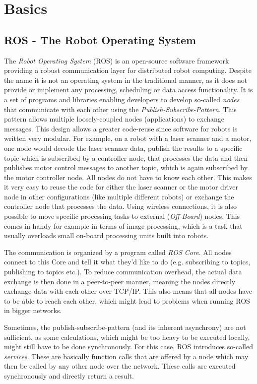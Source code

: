 \chapter{Basics}
\label{chap:basics}
\section{ROS - The Robot Operating System}

The \textit{Robot Operating System} (ROS) is an open-source software framework providing a robust communication layer for distributed robot computing\cite{ros:intro}. Despite the name it is not an operating system in the traditional manner, as it does not provide or implement any processing, scheduling or data access functionality. It is a set of programs and libraries enabling developers to develop so-called \textit{nodes} that communicate with each other using the \textit{Publish-Subscribe-Pattern}.
This pattern allows multiple loosely-coupled nodes (applications) to exchange messages. This design allows a greater code-reuse since software for robots is written very modular\cite{Eugster2003}. For example, on a robot with a laser scanner and a motor, one node would decode the laser scanner data, publish the results to a specific topic which is subscribed by a controller node, that processes the data and then publishes motor control messages to another topic, which is again subscribed by the motor controller node. All nodes do not have to know each other. This makes it very easy to reuse the code for either the laser scanner or the motor driver node in other configurations (like multiple different robots) or exchange the controller node that processes the data. Using wireless connections, it is also possible to move specific processing tasks to external (\textit{Off-Board}) nodes. This comes in handy for example in terms of image processing, which is a task that usually overloads small on-board processing units built into robots.

The communication is organized by a program called \textit{ROS Core}. All nodes connect to this Core and tell it what they'd like to do (e.g. subscribing to topics, publishing to topics etc.). To reduce communication overhead, the actual data exchange is then done in a peer-to-peer manner, meaning the nodes directly exchange data with each other over TCP/IP. This also means that all nodes have to be able to reach each other, which might lead to problems when running ROS in bigger networks.

Sometimes, the publish-subscribe-pattern (and its inherent asynchrony) are not sufficient, as some calculations, which might be too heavy to be executed locally, might still have to be done synchronously. For this case, ROS introduces so-called \textit{services}. These are basically function calls that are offered by a node which may then be called by any other node over the network. These calls are executed synchronously and directly return a result.

